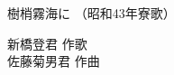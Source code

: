 \documentclass[10pt,b5j]{tarticle} %
\begin{document}
\begin{minipage}[c]{0.7\hsize} %
    \begin{center}
        {\LARGE
            樹梢霧海に %
        }
        {\small 
            （昭和43年寮歌） %
        }
    \end{center}
\end{minipage}
\begin{minipage}[c]{0.3\hsize} %
    \begin{flushright} %
        新橋登君 作歌\\佐藤菊男君 作曲 %
    \end{flushright}
\end{minipage}
\end{document}
